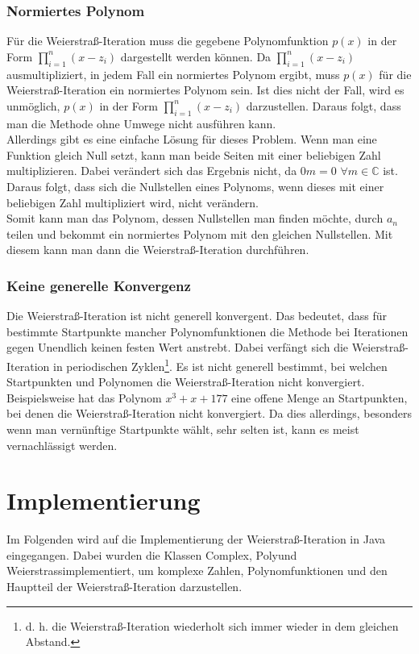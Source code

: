 \documentclass[12pt]{article}
\begin{document}
\subsubsection{Normiertes Polynom}
Für die Weierstraß-Iteration muss die gegebene Polynomfunktion $p(x)$ in der Form $\prod_{i=1}^n (x-z_i)$ dargestellt werden können. Da $\prod_{i=1}^n (x-z_i)$ ausmultipliziert, in jedem Fall ein normiertes Polynom ergibt, muss $p(x)$ für die Weierstraß-Iteration ein normiertes Polynom sein.
Ist dies nicht der Fall, wird es unmöglich, $p(x)$ in der Form $\prod_{i=1}^n (x-z_i)$ darzustellen. Daraus folgt, dass man die Methode ohne Umwege nicht ausführen kann. \\
Allerdings gibt es eine einfache Lösung für dieses Problem. Wenn man eine Funktion gleich Null setzt, kann man beide Seiten mit einer beliebigen Zahl multiplizieren. Dabei verändert sich das Ergebnis nicht, da $0m = 0$ \space $\forall m \in \mathbb{C}$ ist. Daraus folgt, dass sich die Nullstellen eines Polynoms, wenn dieses mit einer beliebigen Zahl multipliziert wird, nicht verändern. \\
Somit kann man das Polynom, dessen Nullstellen man finden möchte, durch $a_n$ teilen und bekommt ein normiertes Polynom mit den gleichen Nullstellen. Mit diesem kann man dann die Weierstraß-Iteration durchführen.

\subsubsection{Keine generelle Konvergenz}
Die Weierstraß-Iteration ist nicht generell konvergent. Das bedeutet, dass für bestimmte Startpunkte mancher Polynomfunktionen die Methode bei Iterationen gegen Unendlich keinen festen Wert anstrebt. Dabei verfängt sich die Weierstraß-Iteration in periodischen Zyklen\footnote{d. h. die Weierstraß-Iteration wiederholt sich immer wieder in dem gleichen Abstand.}. Es ist nicht generell bestimmt, bei welchen Startpunkten und Polynomen die Weierstraß-Iteration nicht konvergiert. Beispielsweise hat das Polynom $x^3+x+177$ eine offene Menge an Startpunkten, bei denen die Weierstraß-Iteration nicht konvergiert. Da dies allerdings, besonders wenn man vernünftige Startpunkte wählt, sehr selten ist, kann es meist vernachlässigt werden. 



\section{Implementierung}
Im Folgenden wird auf die Implementierung der Weierstraß-Iteration in Java eingegangen. Dabei wurden die Klassen \glqq Complex\grqq, \glqq Poly\grqq\space und \glqq Weierstrass\grqq\space implementiert, um komplexe Zahlen, Polynomfunktionen und den Hauptteil der Weierstraß-Iteration darzustellen.
\end{document}
